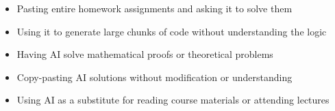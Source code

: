 \documentclass{article}
\begin{document}
\begin{itemize}[nosep]
    \item Pasting entire homework assignments and asking it to solve them
    \item Using it to generate large chunks of code without understanding the logic
    \item Having AI solve mathematical proofs or theoretical problems
    \item Copy-pasting AI solutions without modification or understanding
    \item Using AI as a substitute for reading course materials or attending lectures
\end{itemize}
\end{document}
